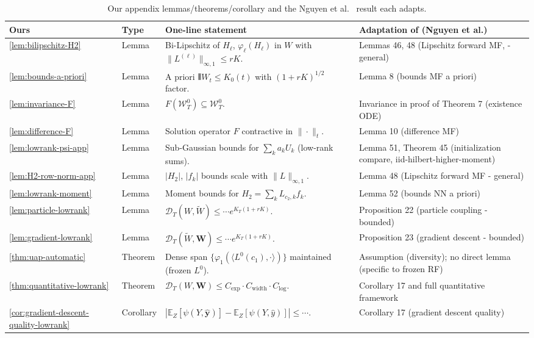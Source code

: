 \documentclass[nohyperref]{article}
\theoremstyle{plain}
\theoremstyle{definition}
\theoremstyle{remark}
\begin{document}
\small
\begin{table}[h!]
\centering
\caption{Our appendix lemmas/theorems/corollary and the Nguyen et al.\ \cite{nguyen2023rigorousframeworkmeanfield} result each adapts.}
\label{tab:our-appendix-mapping}
\setlength{\tabcolsep}{2.5pt}
\begin{tabular}{@{}llp{4.2cm}p{4.4cm}@{}}
\toprule
Ours & Type & One-line statement & Adaptation of (Nguyen et al.) \\
\midrule
\ref{lem:bilipschitz-H2} & Lemma & Bi-Lipschitz of $H_\ell$, $\varphi_\ell(H_\ell)$ in $W$ with $\|L^{(\ell)}\|_{\infty,1}\le rK$. & Lemmas 46, 48 (Lipschitz forward MF, -general) \\
\ref{lem:bounds-a-priori} & Lemma & A priori ${\interleave{W}}_t\le K_0(t)$ with $(1+rK)^{1/2}$ factor. & Lemma 8 (bounds MF a priori) \\
\ref{lem:invariance-F} & Lemma & $F(\mathcal{W}_T^0)\subseteq \mathcal{W}_T^0$. & Invariance in proof of Theorem 7 (existence ODE) \\
\ref{lem:difference-F} & Lemma & Solution operator $F$ contractive in $\|\cdot\|_t$. & Lemma 10 (difference MF) \\
\ref{lem:lowrank-psi-app} & Lemma & Sub-Gaussian bounds for $\sum_k a_k U_k$ (low-rank sums). & Lemma 51, Theorem 45 (initialization compare, iid-hilbert-higher-moment) \\
\ref{lem:H2-row-norm-app} & Lemma & $|H_2|$, $|f_k|$ bounds scale with $\|L\|_{\infty,1}$. & Lemma 48 (Lipschitz forward MF - general) \\
\ref{lem:lowrank-moment} & Lemma & Moment bounds for $H_2=\sum_k L_{c_2,k}f_k$. & Lemma 52 (bounds NN a priori) \\
\ref{lem:particle-lowrank} & Lemma & $\mathscr{D}_T(W,\tilde{W})\le \cdots e^{K_T(1+rK)}$. & Proposition 22 (particle coupling - bounded) \\
\ref{lem:gradient-lowrank} & Lemma & $\mathscr{D}_T(\tilde{W},\mathbf{W})\le \cdots e^{K_T(1+rK)}$. & Proposition 23 (gradient descent - bounded) \\
\ref{thm:uap-automatic} & Theorem & Dense span $\{\varphi_1(\langle L^0(c_1),\cdot\rangle)\}$ maintained (frozen $L^0$). & Assumption (diversity); no direct lemma (specific to frozen RF) \\
\ref{thm:quantitative-lowrank} & Theorem & $\mathscr{D}_T(W,\mathbf{W})\le C_{\exp}\cdot C_{\text{width}}\cdot C_{\log}$. & Corollary 17 and full quantitative framework \\
\ref{cor:gradient-descent-quality-lowrank} & Corollary & $|\mathbb{E}_Z[\psi(Y,\hat{\mathbf{y}})]-\mathbb{E}_Z[\psi(Y,\hat{y})]|\le \cdots$. & Corollary 17 (gradient descent quality) \\
\bottomrule
\end{tabular}
\end{table}
\normalsize
\end{document}
